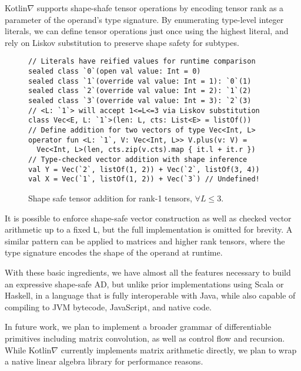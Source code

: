 \documentclass{article}
\begin{document}
\squeezeup Kotlin$\nabla$ supports shape-shafe tensor operations by encoding tensor rank as a parameter of the operand's type signature. By enumerating type-level integer literals, we can define tensor operations just once using the highest literal, and rely on Liskov substitution to preserve shape safety for subtypes.

\squeezeup\begin{figure}[!htb]
\begin{lstlisting}
// Literals have reified values for runtime comparison
sealed class `0`(open val value: Int = 0)
sealed class `1`(override val value: Int = 1): `0`(1)
sealed class `2`(override val value: Int = 2): `1`(2)
sealed class `3`(override val value: Int = 3): `2`(3)
// <L: `1`> will accept 1<=L<=3 via Liskov substitution
class Vec<E, L: `1`>(len: L, cts: List<E> = listOf())
// Define addition for two vectors of type Vec<Int, L>
operator fun <L: `1`, V: Vec<Int, L>> V.plus(v: V) =
  Vec<Int, L>(len, cts.zip(v.cts).map { it.l + it.r })
// Type-checked vector addition with shape inference
val Y = Vec(`2`, listOf(1, 2)) + Vec(`2`, listOf(3, 4))
val X = Vec(`1`, listOf(1, 2)) + Vec(`3`) // Undefined!
\end{lstlisting}
\caption{Shape safe tensor addition for rank-1 tensors, $\forall L\leq3.$}\squeezeup
\end{figure}
\squeezeup
It is possible to enforce shape-safe vector construction as well as checked vector arithmetic up to a fixed \texttt{L}, but the full implementation is omitted for brevity. A similar pattern can be applied to matrices and higher rank tensors, where the type signature encodes the shape of the operand at runtime.

With these basic ingredients, we have almost all the features necessary to build an expressive shape-safe AD, but unlike prior implementations using Scala or Haskell, in a language that is fully interoperable with Java, while also capable of compiling to JVM bytecode, JavaScript, and native code.

In future work, we plan to implement a broader grammar of differentiable primitives including matrix convolution, as well as control flow and recursion. While Kotlin$\nabla$ currently implements matrix arithmetic directly, we plan to wrap a native linear algebra library for performance reasons.

\squeezeup

\end{document}
